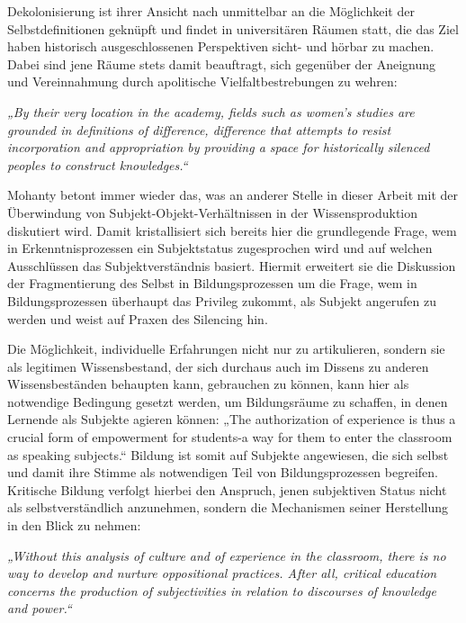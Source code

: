 Dekolonisierung ist ihrer Ansicht nach unmittelbar an die Möglichkeit der
Selbstdefinitionen geknüpft und findet in universitären Räumen statt, die das
Ziel haben historisch ausgeschlossenen Perspektiven sicht- und hörbar zu
machen.\footnotemark{} Dabei sind jene Räume stets damit beauftragt, sich gegenüber der Aneignung und Vereinnahmung durch apolitische Vielfaltbestrebungen zu wehren:
\begin{myenv} 
  \textit{„By their very location in the academy, fields such
    as women's studies are grounded in definitions of difference, difference
    that attempts to resist incorporation and appropriation by providing a
    space for historically silenced peoples to construct
    knowledges.“\footnotemark{} } \end{myenv}

Mohanty betont immer wieder das, was an anderer Stelle in dieser Arbeit mit
der Überwindung von Subjekt-Objekt-Verhältnissen in der Wissensproduktion
diskutiert wird. Damit kristallisiert sich bereits hier die grundlegende
Frage, wem in Erkenntnisprozessen ein Subjektstatus zugesprochen wird und
auf welchen Ausschlüssen das Subjektverständnis basiert. Hiermit erweitert
sie die Diskussion der Fragmentierung des Selbst in Bildungsprozessen um
die Frage, wem in Bildungsprozessen überhaupt das Privileg zukommt, als
Subjekt angerufen zu werden und weist auf Praxen des Silencing hin.

Die Möglichkeit, individuelle Erfahrungen nicht nur zu artikulieren, sondern
sie als legitimen Wissensbestand, der sich durchaus auch im Dissens zu anderen
Wissensbeständen behaupten kann, gebrauchen zu können, kann hier als notwendige
Bedingung gesetzt werden, um Bildungsräume zu schaffen, in denen Lernende als
Subjekte agieren können: „The authorization of experience is thus a crucial
form of empowerment for students-a way for them to enter the classroom as
speaking subjects.“\footnotemark{} Bildung ist somit auf Subjekte angewiesen, die sich selbst
und damit ihre Stimme als notwendigen Teil von Bildungsprozessen begreifen.\\
Kritische Bildung verfolgt hierbei den Anspruch, jenen subjektiven Status nicht
als selbstverständlich anzunehmen, sondern die Mechanismen seiner Herstellung
in den Blick zu nehmen: 
\begin{myenv} 
  \textit{
„Without this analysis of culture and of experience in the classroom, there is no way to develop and nurture oppositional practices. After all, critical education concerns the production of subjectivities in relation to discourses of knowledge and power.“\footnotemark{} } \end{myenv}


